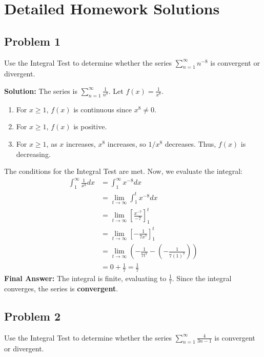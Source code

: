 \documentclass{article}
\begin{document}
\section{Detailed Homework Solutions}

\subsection*{Problem 1}
Use the Integral Test to determine whether the series $\sum_{n=1}^{\infty} n^{-8}$ is convergent or divergent.

\textbf{Solution:}
The series is $\sum_{n=1}^{\infty} \frac{1}{n^8}$. Let $f(x) = \frac{1}{x^8}$.
\begin{enumerate}
    \item For $x \ge 1$, $f(x)$ is continuous since $x^8 \ne 0$.
    \item For $x \ge 1$, $f(x)$ is positive.
    \item For $x \ge 1$, as $x$ increases, $x^8$ increases, so $1/x^8$ decreases. Thus, $f(x)$ is decreasing.
\end{enumerate}
The conditions for the Integral Test are met. Now, we evaluate the integral:
\begin{align*}
    \int_1^\infty \frac{1}{x^8} dx &= \int_1^\infty x^{-8} dx \\
    &= \lim_{t \to \infty} \int_1^t x^{-8} dx \\
    &= \lim_{t \to \infty} \left[ \frac{x^{-7}}{-7} \right]_1^t \\
    &= \lim_{t \to \infty} \left[ -\frac{1}{7x^7} \right]_1^t \\
    &= \lim_{t \to \infty} \left( -\frac{1}{7t^7} - \left(-\frac{1}{7(1)^7}\right) \right) \\
    &= 0 + \frac{1}{7} = \frac{1}{7}
\end{align*}
\textbf{Final Answer:} The integral is finite, evaluating to $\frac{1}{7}$. Since the integral converges, the series is \textbf{convergent}.

\subsection*{Problem 2}
Use the Integral Test to determine whether the series $\sum_{n=1}^{\infty} \frac{4}{3n-1}$ is convergent or divergent.
\end{document}
